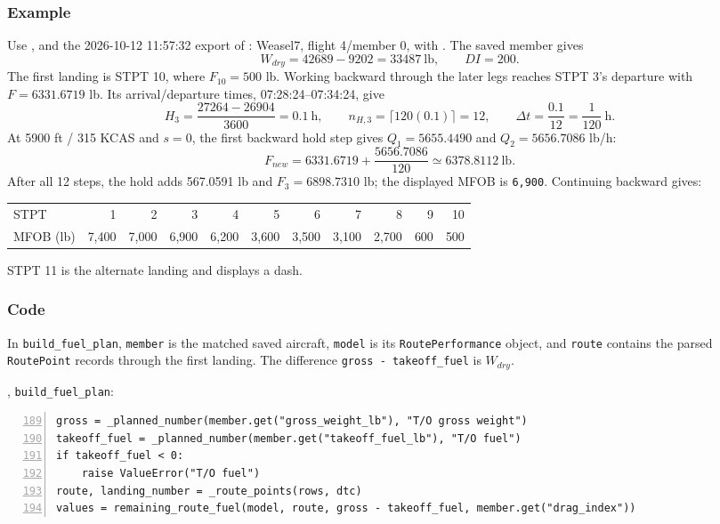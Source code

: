 \documentclass[10pt,a4paper]{amsart}
\begin{document}
\subsubsection*{Example}
Use ,
 and the 2026-10-12 11:57:32 export of
: Weasel7, flight 4/member 0,
with .
The saved member gives
\[
 W_{dry}=42689-9202=33487\ \text{lb},\qquad DI=200.
\]
The first landing is STPT 10, where $F_{10}=500$ lb.
Working backward through the later legs reaches STPT 3's departure
with $F=6331.6719$ lb. Its arrival/departure times,
07:28:24--07:34:24, give
\[
 H_3=\frac{27264-26904}{3600}=0.1\ \text{h},\qquad
 n_{H,3}=\lceil120(0.1)\rceil=12,\qquad
 \Delta t=\frac{0.1}{12}=\frac1{120}\ \text{h}.
\]
At 5900 ft / 315 KCAS and $s=0$, the first backward hold step gives
$Q_1=5655.4490$ and $Q_2=5656.7086$ lb/h:
\[
 F_{new}=6331.6719+\frac{5656.7086}{120}
        \simeq6378.8112\ \text{lb}.
\]
After all 12 steps, the hold adds 567.0591 lb and
$F_3=6898.7310$ lb; the displayed MFOB is \texttt{6,900}.
Continuing backward gives:
\begin{center}\small
\begin{tabular}{@{}lrrrrrrrrrr@{}}\hline
STPT &1&2&3&4&5&6&7&8&9&10\\
MFOB (lb)&7,400&7,000&6,900&6,200&3,600&3,500&3,100&2,700&600&500\\\hline
\end{tabular}\end{center}
STPT 11 is the alternate landing and displays a dash.

\subsubsection*{Code}
In \texttt{build\_fuel\_plan}, \texttt{member} is the matched saved
aircraft, \texttt{model} is its \texttt{RoutePerformance} object, and
\texttt{route} contains the parsed \texttt{RoutePoint} records through
the first landing. The difference \texttt{gross - takeoff\_fuel} is
$W_{dry}$.

, \texttt{build\_fuel\_plan}:
\begin{lstlisting}[numbers=left,firstnumber=189,numberstyle=\tiny,xleftmargin=2em]
gross = _planned_number(member.get("gross_weight_lb"), "T/O gross weight")
takeoff_fuel = _planned_number(member.get("takeoff_fuel_lb"), "T/O fuel")
if takeoff_fuel < 0:
    raise ValueError("T/O fuel")
route, landing_number = _route_points(rows, dtc)
values = remaining_route_fuel(model, route, gross - takeoff_fuel, member.get("drag_index"))
\end{lstlisting}
\end{document}

